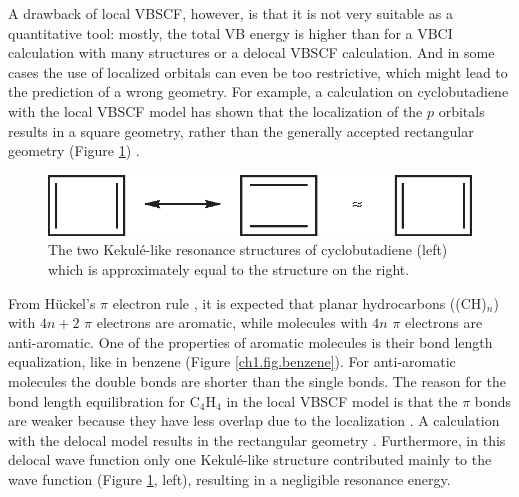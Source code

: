 A drawback of local VBSCF, however, is that it is not very suitable as a quantitative tool: mostly, the total VB energy is higher than for a VBCI calculation with many structures or a delocal VBSCF calculation. And in some cases the use of localized orbitals can even be too restrictive, which might lead to the prediction of a wrong geometry. For example, a calculation on cyclobutadiene with the local VBSCF model \cite{cyclobutt} has shown that the localization of the $p$ orbitals results in a square geometry, rather than the generally accepted rectangular geometry (Figure \ref{ch1.fig.butadiene}) \cite{arnold}. 
\begin{figure}[htp]
\center
\includegraphics{introduction/figures/butadiene.eps}
\caption{The two Kekul\'e-like resonance structures of cyclobutadiene (left) which is approximately equal to the structure on the right.}
\label{ch1.fig.butadiene}
\end{figure}
From H\"{u}ckel's $\pi$ electron rule \cite{huckel2,huckel4}, it is expected that planar hydrocarbons ((CH)$_n$) with $4n+2$ $\pi$ electrons are aromatic, while molecules with $4n$ $\pi$ electrons are anti-aromatic. One of the properties of aromatic molecules is their bond length equalization, like in benzene (Figure \ref{ch1.fig.benzene}). For anti-aromatic molecules the double bonds are shorter than the single bonds. The reason for the bond length equilibration for C$_4$H$_4$ in the local VBSCF model is that the $\pi$ bonds are weaker because they have less overlap due to the localization \cite{cyclobutt}. A calculation with the delocal model results in the rectangular geometry \cite{cyclobutt}. Furthermore, in this delocal wave function only one Kekul\'{e}-like structure contributed mainly to the wave function (Figure \ref{ch1.fig.butadiene}, left), resulting in a negligible resonance energy.

